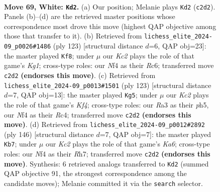 \documentclass[11pt]{article}
\begin{document}
\clearpage

\begin{figure}[p]\centering
\begin{subfigure}{0.46\textwidth}\centering
\resizebox{\linewidth}{!}{%
\newchessgame
\chessboard[
  setfen={8/8/8/1k6/5N2/R7/2K3P1/6r1 w - - 2 69},
  showmover=false,
  pgfstyle=straightmove, color=movearrow, markmove={c2-d2}
]}
\caption{}
\end{subfigure}\hfill
\begin{subfigure}{0.46\textwidth}\centering
\resizebox{\linewidth}{!}{%
\newchessgame
\chessboard[
  setfen={6k1/R7/p1r5/7K/8/8/8/8 b - - 0 62},
  showmover=false,
  pgfstyle=straightmove, color=movearrow, markmove={g8-f8}
]}
\caption{}
\end{subfigure}
\\[4pt]
\begin{subfigure}{0.46\textwidth}\centering
\resizebox{\linewidth}{!}{%
\newchessgame
\chessboard[
  setfen={8/8/R1p5/5k1P/2r5/6K1/8/8 b - - 0 62},
  showmover=false,
  pgfstyle=straightmove, color=movearrow, markmove={f5-g5}
]}
\caption{}
\end{subfigure}\hfill
\begin{subfigure}{0.46\textwidth}\centering
\resizebox{\linewidth}{!}{%
\newchessgame
\chessboard[
  setfen={8/2P4R/K3k3/8/8/2r5/8/8 w - - 5 74},
  showmover=false,
  pgfstyle=straightmove, color=movearrow, markmove={a6-b7}
]}
\caption{}
\end{subfigure}
\caption{\textbf{Move 69, White: \texttt{Kd2}.} (a) Our position; Melanie plays \texttt{Kd2} (\texttt{c2d2}). Panels (b)--(d) are the retrieved master positions whose correspondence most drove this move (highest QAP objective among those that transfer to it). (b) Retrieved from \texttt{lichess\_elite\_2024-09\_p0026\#1486} (ply 123) [structural distance $d$=6, QAP obj=23]: the master played \texttt{Kf8}; under $\mu$ our \emph{Kc2} plays the role of that game's \emph{Kg1}; cross-type roles: our \emph{N}f4 as their \emph{R}c6; transferred move \texttt{c2d2} \textbf{(endorses this move)}. (c) Retrieved from \texttt{lichess\_elite\_2024-09\_p0013\#1501} (ply 123) [structural distance $d$=7, QAP obj=13]: the master played \texttt{Kg5}; under $\mu$ our \emph{Kc2} plays the role of that game's \emph{Kf4}; cross-type roles: our \emph{R}a3 as their \emph{p}h5, our \emph{N}f4 as their \emph{R}c4; transferred move \texttt{c2d2} \textbf{(endorses this move)}. (d) Retrieved from \texttt{lichess\_elite\_2024-09\_p0012\#2892} (ply 146) [structural distance $d$=7, QAP obj=7]: the master played \texttt{Kb7}; under $\mu$ our \emph{Kc2} plays the role of that game's \emph{Ka6}; cross-type roles: our \emph{N}f4 as their \emph{R}h7; transferred move \texttt{c2d2} \textbf{(endorses this move)}. Synthesis: 6 retrieved analogs transferred to \texttt{Kd2} (summed QAP objective 91, the strongest correspondence among the candidate moves); Melanie committed it via the \texttt{search} selector.}
\label{fig:thought-m136}
\end{figure}
\end{document}
